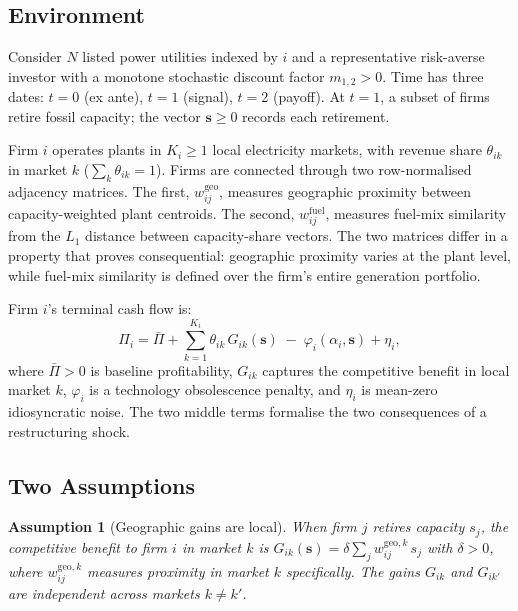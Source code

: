 \documentclass[12pt,a4paper]{article}
\newtheorem{assumption}{Assumption}
\begin{document}
\subsection{Environment}\label{sec:environment}

Consider $N$ listed power utilities indexed by $i$ and a representative risk-averse investor with a monotone stochastic discount factor $m_{1,2} > 0$. Time has three dates: $t=0$ (ex ante), $t=1$ (signal), $t=2$ (payoff). At $t=1$, a subset of firms retire fossil capacity; the vector $\mathbf{s} \geq 0$ records each retirement.

Firm $i$ operates plants in $K_i \geq 1$ local electricity markets, with revenue share $\theta_{ik}$ in market $k$ ($\sum_k \theta_{ik} = 1$). Firms are connected through two row-normalised adjacency matrices. The first, $w^{\text{geo}}_{ij}$, measures geographic proximity between capacity-weighted plant centroids. The second, $w^{\text{fuel}}_{ij}$, measures fuel-mix similarity from the $L_1$ distance between capacity-share vectors. The two matrices differ in a property that proves consequential: geographic proximity varies at the plant level, while fuel-mix similarity is defined over the firm's entire generation portfolio.

Firm $i$'s terminal cash flow is:
\begin{equation}\label{eq:cashflows}
    \Pi_i = \bar{\Pi} + \sum_{k=1}^{K_i} \theta_{ik}\, G_{ik}(\mathbf{s}) \;-\; \varphi_i(\alpha_i, \mathbf{s}) + \eta_i,
\end{equation}
where $\bar{\Pi} > 0$ is baseline profitability, $G_{ik}$ captures the competitive benefit in local market $k$, $\varphi_i$ is a technology obsolescence penalty, and $\eta_i$ is mean-zero idiosyncratic noise. The two middle terms formalise the two consequences of a restructuring shock.

\subsection{Two Assumptions}\label{sec:channels}

\begin{assumption}[Geographic gains are local]\label{ass:competition}
    When firm $j$ retires capacity $s_j$, the competitive benefit to firm $i$ in market $k$ is $G_{ik}(\mathbf{s}) = \delta \sum_j w^{\mathrm{geo},k}_{ij}\, s_j$ with $\delta > 0$, where $w^{\mathrm{geo},k}_{ij}$ measures proximity in market $k$ specifically. The gains $G_{ik}$ and $G_{ik'}$ are independent across markets $k \neq k'$.
\end{assumption}
\end{document}

